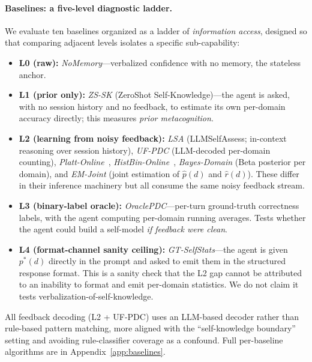 \documentclass[11pt]{article}
\begin{document}
\paragraph{Baselines: a five-level diagnostic ladder.} We evaluate ten baselines organized as a ladder of \emph{information access}, designed so that comparing adjacent levels isolates a specific sub-capability:
\begin{itemize}[nosep,leftmargin=1.4em]
  \item \textbf{L0 (raw):} \emph{NoMemory}---verbalized confidence with no memory, the stateless anchor.
  \item \textbf{L1 (prior only):} \emph{ZS-SK} (ZeroShot Self-Knowledge)---the agent is asked, with no session history and no feedback, to estimate its own per-domain accuracy directly; this measures \emph{prior metacognition}.
  \item \textbf{L2 (learning from noisy feedback):} \emph{LSA} (LLMSelfAssess; in-context reasoning over session history), \emph{UF-PDC} (LLM-decoded per-domain counting), \emph{Platt-Online}~\citep{platt1999probabilistic}, \emph{HistBin-Online}~\citep{zadrozny2001obtaining}, \emph{Bayes-Domain} (Beta posterior per domain), and \emph{EM-Joint} (joint estimation of $\hat{p}(d)$ and $\hat{r}(d)$). These differ in their inference machinery but all consume the same noisy feedback stream.
  \item \textbf{L3 (binary-label oracle):} \emph{OraclePDC}---per-turn ground-truth correctness labels, with the agent computing per-domain running averages. Tests whether the agent could build a self-model \emph{if feedback were clean}.
  \item \textbf{L4 (format-channel sanity ceiling):} \emph{GT-SelfStats}---the agent is given $p^*(d)$ directly in the prompt and asked to emit them in the structured response format. This is a sanity check that the L2 gap cannot be attributed to an inability to format and emit per-domain statistics. We do not claim it tests verbalization-of-self-knowledge.
\end{itemize}
All feedback decoding (L2 + UF-PDC) uses an LLM-based decoder rather than rule-based pattern matching, more aligned with the ``self-knowledge boundary'' setting and avoiding rule-classifier coverage as a confound. Full per-baseline algorithms are in Appendix~\ref{app:baselines}.

\end{document}
